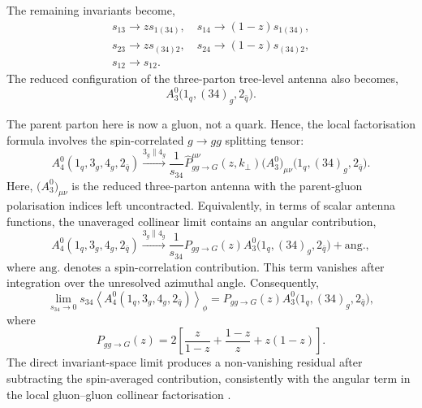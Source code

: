 The remaining invariants become,
\begin{equation}
    \begin{gathered}
        s_{13}\to zs_{1(34)},\quad s_{14}\to(1-z)s_{1(34)},\\
        s_{23}\to zs_{(34)2},\quad s_{24}\to(1-z)s_{(34)2},\\
        s_{12}\to s_{12}.
    \end{gathered}
\end{equation} 
The reduced configuration of the three-parton tree-level antenna also becomes,
\begin{equation}
    A_3^0\Big(1_q,(34)_g,2_{\bar q}\Big).
\end{equation}

The parent parton here is now a gluon, not a quark. Hence, the local factorisation
formula involves the spin-correlated $g\to gg$ splitting tensor:
\begin{equation}
    A_4^0(1_q,3_g,4_g,2_{\bar q})\xrightarrow{3_g\parallel 4_g}\frac1{s_{34}}\hat P_{gg\to G}^{\mu\nu}(z,k_\perp)\big(A_3^0\big)_{\mu\nu}\Big(1_q,(34)_g,2_{\bar q}\Big).
\end{equation}
Here, $\big(A_3^0\big)_{\mu\nu}$ is the reduced three-parton antenna with the parent-gluon polarisation
indices left uncontracted. Equivalently, in terms of scalar antenna functions, the
unaveraged collinear limit contains an angular contribution,
\begin{equation}
    A_4^0(1_q,3_g,4_g,2_{\bar q})\xrightarrow{3_g\parallel 4_g}\frac1{s_{34}}P_{gg\to G}(z)A_3^0\Big(1_q,(34)_g,2_{\bar q}\Big)+\mathrm{ang.},
\end{equation}
where $\mathrm{ang.}$ denotes a spin-correlation contribution. This term
vanishes after integration over the unresolved azimuthal angle. Consequently,
\begin{equation}
    \lim_{s_{34}\to0}s_{34}\left\langle A_4^0(1_q,3_g,4_g,2_{\bar q})\right\rangle_\phi = P_{gg\to G}(z)A_3^0\Big(1_q,(34)_g,2_{\bar q}\Big),
\end{equation}
where
\begin{equation}
    P_{gg\to G}(z)=2\left[\frac{z}{1-z}+\frac{1-z}{z}+z(1-z)\right].
\end{equation}
The direct invariant-space limit produces a non-vanishing residual after
subtracting the spin-averaged contribution, consistently with the angular term
in the local gluon--gluon collinear factorisation \cite{Gehrmann-DeRidder:2005btv}.

